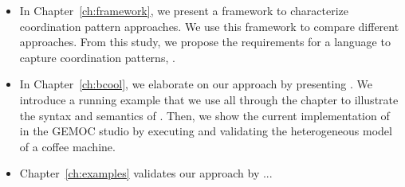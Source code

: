 \begin{itemize}
\item In Chapter~\ref{ch:framework}, we present a framework to characterize coordination pattern approaches. We use this framework to compare different approaches. From this study, we propose the requirements for a language to capture coordination patterns, \ie \bcool.  

\item In Chapter~\ref{ch:bcool}, we elaborate on our approach by presenting \bcool. We introduce a running example that we use all through the chapter to illustrate the syntax and semantics of \bcool. Then, we show the current implementation of \bcool in the GEMOC studio by executing and validating the heterogeneous model of a coffee machine. 

\item Chapter~\ref{ch:examples} validates our approach by ...

	
	
\end{itemize}






